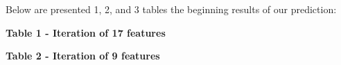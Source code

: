 Below are presented 1, 2, and 3 tables the beginning results of our
prediction:

{\bfseries Table 1 - Iteration of 17 features}


{\bfseries Table 2 - Iteration of 9 features}

